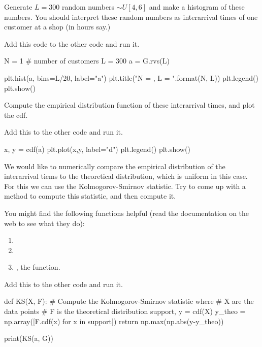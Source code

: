 \documentclass{scrartcl}
\begin{document}
\begin{exercise}
Generate $L=300$ random numbers $\sim U[4,6]$ and make a histogram of these numbers. You should interpret these random numbers as interarrival times of one customer at a shop (in hours say.)
\begin{solution}
Add this code to the other code and run it.
\begin{pyverbatim}
N = 1 # number of customers
L = 300
a = G.rvs(L)

plt.hist(a, bins=L/20, label="a")
plt.title("N = {}, L = {}".format(N, L))
plt.legend()
plt.show()
\end{pyverbatim}
\end{solution}
\end{exercise}

\begin{exercise}
Compute  the empirical distribution function of these interarrival times, and plot the cdf.
\begin{solution}
Add this to the other code and run it.
\begin{pyverbatim}
x, y = cdf(a)
plt.plot(x,y,  label="d")
plt.legend()
plt.show()
\end{pyverbatim}
\end{solution}
\end{exercise}

\begin{exercise}
We would like to numerically compare the empirical distribution of the interarrival tiems to the theoretical distribution, which is uniform in this case. 
For this we can use the Kolmogorov-Smirnov statistic. Try to come up with a method to compute this statistic, and then compute it. 

You might find the following functions helpful (read the documentation on the web to see what they do):
\begin{enumerate}
\item {}
\item {}
\item {}, the  function.
\end{enumerate}

\begin{solution}
Add this to the other code and run it.
\begin{pyverbatim}
def KS(X, F):
    # Compute the Kolmogorov-Smirnov statistic where
    # X are the data points
    # F is the theoretical distribution
    support, y = cdf(X)
    y_theo = np.array([F.cdf(x) for x in support])
    return np.max(np.abs(y-y_theo))

print(KS(a, G))    
\end{pyverbatim}
\end{solution}
\end{exercise}
\end{document}
